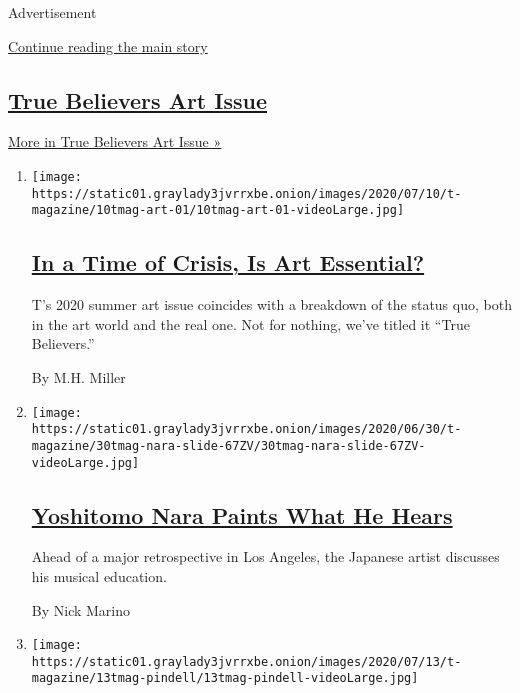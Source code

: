 Advertisement

\protect\hyperlink{after-mid1}{Continue reading the main story}

\hypertarget{true-believers-art-issue}{%
\subsection{\texorpdfstring{\href{/issue/t-magazine/2020/07/02/true-believers-art-issue}{True
Believers Art
Issue}}{True Believers Art Issue}}\label{true-believers-art-issue}}

\href{/issue/t-magazine/2020/07/02/true-believers-art-issue}{More in
True Believers Art Issue »}

\begin{enumerate}
\def\labelenumi{\arabic{enumi}.}
\item
  \texttt{[image: https://static01.graylady3jvrrxbe.onion/images/2020/07/10/t-magazine/10tmag-art-01/10tmag-art-01-videoLarge.jpg]}

  \hypertarget{in-a-time-of-crisis-is-art-essential}{%
  \subsection{\texorpdfstring{\href{/2020/07/20/t-magazine/museums-galleries-open-art.html}{In
  a Time of Crisis, Is Art
  Essential?}}{In a Time of Crisis, Is Art Essential?}}\label{in-a-time-of-crisis-is-art-essential}}

  T's 2020 summer art issue coincides with a breakdown of the status
  quo, both in the art world and the real one. Not for nothing, we've
  titled it ``True Believers.''

  By M.H. Miller
\item
  \texttt{[image: https://static01.graylady3jvrrxbe.onion/images/2020/06/30/t-magazine/30tmag-nara-slide-67ZV/30tmag-nara-slide-67ZV-videoLarge.jpg]}

  \hypertarget{yoshitomo-nara-paints-what-he-hears}{%
  \subsection{\texorpdfstring{\href{/2020/07/24/t-magazine/yoshitomo-nara.html}{Yoshitomo
  Nara Paints What He
  Hears}}{Yoshitomo Nara Paints What He Hears}}\label{yoshitomo-nara-paints-what-he-hears}}

  Ahead of a major retrospective in Los Angeles, the Japanese artist
  discusses his musical education.

  By Nick Marino
\item
  \texttt{[image: https://static01.graylady3jvrrxbe.onion/images/2020/07/13/t-magazine/13tmag-pindell/13tmag-pindell-videoLarge.jpg]}


\end{enumerate}

